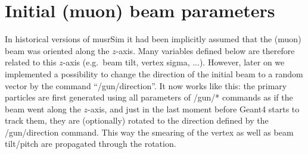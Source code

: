 \documentclass[twoside]{dis04}
\begin{document}
\section{Initial (muon) beam parameters}
%
In historical versions of musrSim 
it had been implicitly assumed that the (muon) beam was oriented along the $z$-axis.  Many
variables defined below are therefore related to this $z$-axis (e.g.\ beam tilt, vertex sigma, ...).
However, later on we implemented a possibility to change the direction of the initial beam
to a random vector by the command ``/gun/direction''.  It now works like this:
the primary particles are first generated using all parameters of /gun/* commands 
as if the beam went along the $z$-axis, and just in the last moment before Geant4 starts
to track them, they are (optionally) rotated to the direction defined by the /gun/direction command.
This way the smearing of the vertex as well as beam tilt/pitch are propagated through the rotation.
\end{document}
